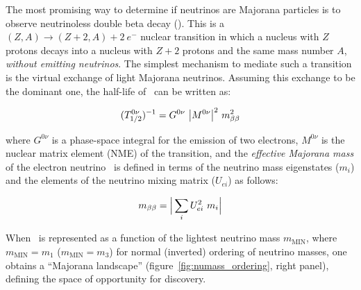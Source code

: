 \indent

The most promising way to determine if neutrinos are Majorana particles is to observe neutrinoless double beta decay (\bbonu). This is a $(Z,A) \rightarrow (Z+2,A) + 2\ e^{-}$ nuclear transition in which a nucleus with $Z$ protons decays into a nucleus with $Z+2$ protons and the same mass number $A$, {\em without emitting neutrinos}. The simplest mechanism to mediate such a transition is the virtual exchange of light Majorana neutrinos. Assuming this exchange to be the  dominant one, the half-life of \bbonu\ can be written as:

\begin{equation}
(T^{0\nu}_{1/2})^{-1} = G^{0\nu} \ \big|M^{0\nu}\big|^{2} \ \mbb^{2}
\label{eq:halflife}
\end{equation}

\noindent where $G^{0\nu}$ is a phase-space integral for the emission of two electrons, $M^{0\nu}$ is the nuclear matrix element (NME) of the transition, and the \emph{effective Majorana mass} of the electron neutrino \mbb\ is defined in terms of the neutrino mass eigenstates ($m_{i}$) and the elements of the neutrino mixing matrix ($U_{ei}$) as follows:

\begin{equation}
m_{\beta\beta} = \Big| \sum_{i} U^{2}_{ei} \ m_{i} \Big|
\label{eq:mbb}
\end{equation}


\indent

When \mbb\ is represented as a function of the lightest neutrino mass $m_\mathrm{MIN}$, where $m_\mathrm{MIN}=m_1$ ($m_\mathrm{MIN}=m_3$) for normal (inverted) ordering of neutrino masses, one obtains a ``Majorana landscape'' (figure~\ref{fig:numass_ordering}, right panel), defining the space of opportunity for discovery.

\indent

